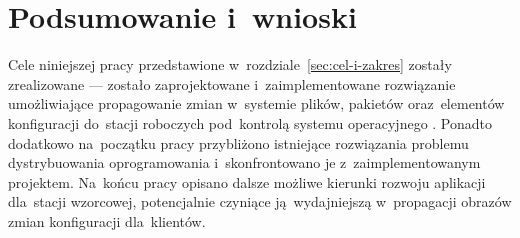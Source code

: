 \documentclass[thesis]{subfiles}
\begin{document}
%


\section{Podsumowanie i~wnioski}

Cele niniejszej pracy przedstawione w~rozdziale~\ref{sec:cel-i-zakres} zostały zrealizowane --- zostało zaprojektowane i~zaimplementowane rozwiązanie umożliwiające propagowanie zmian w~systemie plików, pakietów oraz~elementów konfiguracji do~stacji roboczych pod~kontrolą systemu operacyjnego . Ponadto dodatkowo na~początku pracy przybliżono istniejące rozwiązania problemu dystrybuowania oprogramowania i~skonfrontowano je z~zaimplementowanym projektem. Na~końcu pracy opisano dalsze możliwe kierunki rozwoju aplikacji \texttt{\srvappname{}} dla~stacji wzorcowej, potencjalnie czyniące ją~wydajniejszą w~propagacji obrazów zmian konfiguracji dla~klientów.
\end{document}
